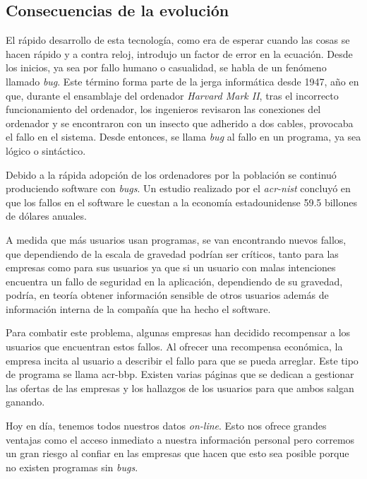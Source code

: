 \documentclass[titlepage, 12pt, a4paper]{article}
\begin{document}
\subsection{Consecuencias de la evolución}
El rápido desarrollo de esta tecnología, como era de esperar cuando las cosas se hacen rápido y a contra reloj, introdujo un factor de error en la ecuación. Desde los inicios, ya sea por fallo humano o casualidad, se habla de un fenómeno llamado \textit{\gls{bug}}. Este término forma parte de la jerga informática desde 1947, año en que, durante el ensamblaje del ordenador \textit{Harvard Mark II}, tras el incorrecto funcionamiento del ordenador, los ingenieros revisaron las conexiones del ordenador y se encontraron con un insecto que adherido a dos cables, provocaba el fallo en el sistema. Desde entonces, se llama \textit{\gls{bug}} al fallo en un programa, ya sea lógico o sintáctico.\par Debido a la rápida adopción de los ordenadores por la población se continuó produciendo software con \textit{\gls{bug}s}. Un estudio realizado por el \textit{\gls{acr-nist}} concluyó en que los fallos en el software le cuestan a la economía estadounidense 59.5 billones de dólares anuales.\cite{NIST}\par A medida que más usuarios usan programas, se van encontrando nuevos fallos, que dependiendo de la escala de gravedad podrían ser críticos, tanto para las empresas como para sus usuarios ya que si un usuario con malas intenciones encuentra un fallo de seguridad en la aplicación, dependiendo de su gravedad, podría, en teoría obtener información sensible de otros usuarios además de información interna de la compañía que ha hecho el software.\par Para combatir este problema, algunas empresas han decidido recompensar a los usuarios que encuentran estos fallos. Al ofrecer una recompensa económica, la empresa incita al usuario a describir el fallo para que se pueda arreglar. Este tipo de programa se llama \gls{acr-bbp}. Existen varias páginas que se dedican a gestionar las ofertas de las empresas y los hallazgos de los usuarios para que ambos salgan ganando.\par Hoy en día, tenemos todos nuestros datos \textit{on-line}. Esto nos ofrece grandes ventajas como el acceso inmediato a nuestra información personal pero corremos un gran riesgo al confiar en las empresas que hacen que esto sea posible porque no existen programas sin  \textit{\gls{bug}s}.
\end{document}
